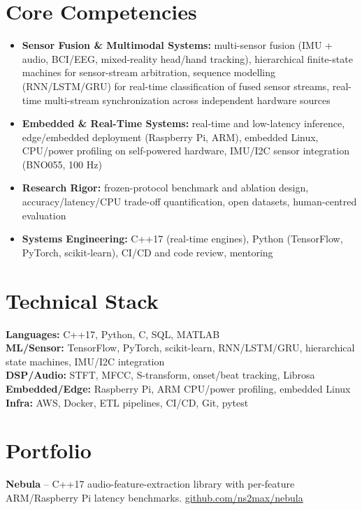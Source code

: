 \documentclass[11pt]{article}
\begin{document}
\section*{Core Competencies}
\begin{itemize}[leftmargin=2em, itemsep=-0.3em, topsep=0em]
\item \textbf{Sensor Fusion \& Multimodal Systems:} multi-sensor fusion (IMU + audio, BCI/EEG, mixed-reality head/hand tracking), hierarchical finite-state machines for sensor-stream arbitration, sequence modelling (RNN/LSTM/GRU) for real-time classification of fused sensor streams, real-time multi-stream synchronization across independent hardware sources
\item \textbf{Embedded \& Real-Time Systems:} real-time and low-latency inference, edge/embedded deployment (Raspberry Pi, ARM), embedded Linux, CPU/power profiling on self-powered hardware, IMU/I2C sensor integration (BNO055, 100 Hz)
\item \textbf{Research Rigor:} frozen-protocol benchmark and ablation design, accuracy/latency/CPU trade-off quantification, open datasets, human-centred evaluation
\item \textbf{Systems Engineering:} C++17 (real-time engines), Python (TensorFlow, PyTorch, scikit-learn), CI/CD and code review, mentoring
\end{itemize}

\section*{Technical Stack}
\textbf{Languages:} C++17, Python, C, SQL, MATLAB \\
\textbf{ML/Sensor:} TensorFlow, PyTorch, scikit-learn, RNN/LSTM/GRU, hierarchical state machines, IMU/I2C integration \\
\textbf{DSP/Audio:} STFT, MFCC, S-transform, onset/beat tracking, Librosa \\
\textbf{Embedded/Edge:} Raspberry Pi, ARM CPU/power profiling, embedded Linux \\
\textbf{Infra:} AWS, Docker, ETL pipelines, CI/CD, Git, pytest

\section*{Portfolio}
\textbf{Nebula} -- C++17 audio-feature-extraction library with per-feature ARM/Raspberry Pi latency benchmarks. \href{https://github.com/ns2max/nebula}{github.com/ns2max/nebula}
\end{document}
